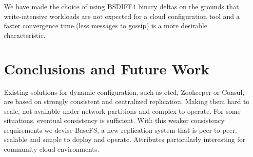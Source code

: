 \documentclass{sig-alternate}
\begin{document}
We have made the choice of using BSDIFF4 binary deltas on the grounds that write-intensive workloads are not expected for a cloud configuration tool and a faster convergence time (less messages to gossip) is a more desirable characteristic.


\section{Conclusions and Future Work}

Existing solutions for dynamic configuration, such as etcd, Zookeeper or Consul, are based on strongly consistent and centralized replication. Making them hard to scale, not available under network partitions and complex to operate. For some situations, eventual consistency is sufficient. With this weaker consistency requirements we devise BaseFS, a new replication system that is peer-to-peer, scalable and simple to deploy and operate. Attributes particularly interesting for community cloud environments.
\end{document}
